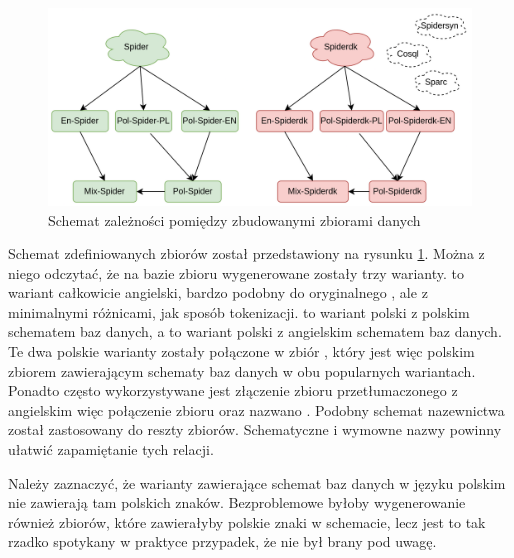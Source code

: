 \begin{figure}[ht!]
  \centering
  \includegraphics[width=1.0\linewidth]{images/datasets.png}
  \caption{Schemat zależności pomiędzy zbudowanymi zbiorami danych}
  \label{fig:datasets}
\end{figure}

Schemat zdefiniowanych zbiorów został przedstawiony na rysunku \ref{fig:datasets}. Można z niego odczytać, że na bazie zbioru  wygenerowane zostały trzy warianty.  to wariant całkowicie angielski, bardzo podobny do oryginalnego , ale z minimalnymi różnicami, jak sposób tokenizacji.  to wariant polski z polskim schematem baz danych, a  to wariant polski z angielskim schematem baz danych. Te dwa polskie warianty zostały połączone w zbiór , który jest więc polskim zbiorem zawierającym schematy baz danych w obu popularnych wariantach. Ponadto często wykorzystywane jest złączenie zbioru przetłumaczonego z angielskim więc połączenie zbioru  oraz  nazwano . Podobny schemat nazewnictwa został zastosowany do reszty zbiorów. Schematyczne i wymowne nazwy powinny ułatwić zapamiętanie tych relacji.



Należy zaznaczyć, że warianty zawierające schemat baz danych w języku polskim nie zawierają tam polskich znaków. Bezproblemowe byłoby wygenerowanie również zbiorów, które zawierałyby polskie znaki w schemacie, lecz jest to tak rzadko spotykany w praktyce przypadek, że nie był brany pod uwagę.

